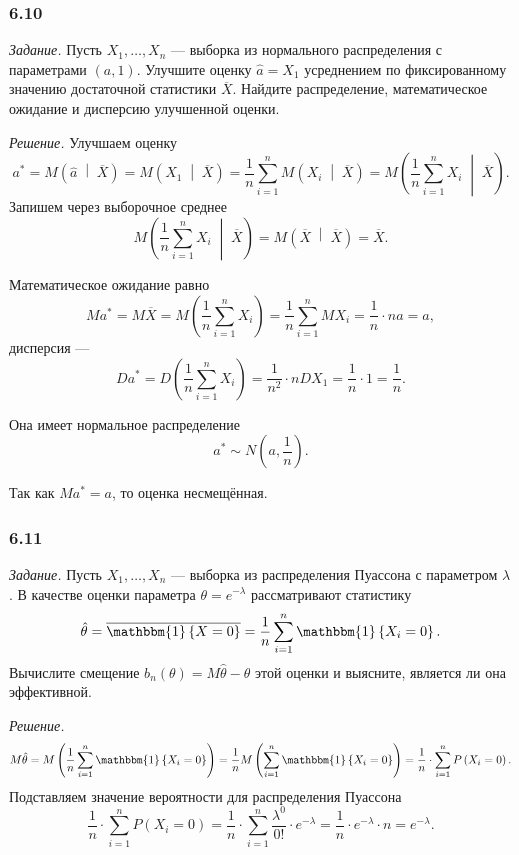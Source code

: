 \subsubsection*{6.10}

\textit{Задание.}
Пусть $X_1, \dotsc, X_n$ ---
выборка из нормального распределения с параметрами $ \left( a, 1 \right) $.
Улучшите оценку $ \hat{a} = X_1$ усреднением по фиксированному значению достаточной
статистики $ \overline{X}$.
Найдите распределение, математическое ожидание и дисперсию улучшенной оценки.

\textit{Решение.} Улучшаем оценку
$$a^* =
  M \left( \hat{a} \; \middle| \; \overline{X} \right) =
  M \left( X_1 \; \middle| \; \overline{X} \right) =
  \frac{1}{n} \sum \limits_{i = 1}^n M \left( X_i \; \middle| \; \overline{X} \right) =
  M \left( \frac{1}{n} \sum \limits_{i = 1}^n X_i \; \middle| \; \overline{X} \right).$$
Запишем через выборочное среднее
$$M \left( \frac{1}{n} \sum \limits_{i = 1}^n X_i \; \middle| \; \overline{X} \right) =
  M \left( \overline{X} \; \middle| \; \overline{X} \right) =
  \overline{X}.$$

Математическое ожидание равно
$$Ma^* =
  M \overline{X} =
  M \left( \frac{1}{n} \sum \limits_{i = 1}^n X_i \right) =
  \frac{1}{n} \sum \limits_{i = 1}^n MX_i =
  \frac{1}{n} \cdot na =
  a,$$
дисперсия ---
$$Da^* =
  D \left( \frac{1}{n} \sum \limits_{i = 1}^n X_i \right) =
  \frac{1}{n^2} \cdot n DX_1 =
  \frac{1}{n} \cdot 1 =
  \frac{1}{n}.$$

Она имеет нормальное распределение
$$a^* \sim
  N \left( a, \frac{1}{n} \right).$$

Так как $Ma^* = a$, то оценка несмещённая.

\subsubsection*{6.11}

\textit{Задание.}
Пусть $X_1, \dotsc, X_n$ --- выборка из распределения Пуассона с параметром $ \lambda $.
В качестве оценки параметра $ \theta = e^{- \lambda }$ рассматривают статистику
$$ \hat{ \theta } =
  \overline{ \mathbbm{1} \left\{ X = 0 \right\} } =
  \frac{1}{n} \sum \limits_{i = 1}^n \mathbbm{1} \left\{ X_i = 0 \right\}.$$
Вычислите смещение $b_n \left( \theta \right) = M \hat{ \theta } - \theta $ этой оценки и выясните,
является ли она эффективной.

\textit{Решение.}
$$M \hat{ \theta } =
  M \left( \frac{1}{n} \sum \limits_{i = 1}^n \mathbbm{1} \left\{ X_i = 0 \right\} \right) =
  \frac{1}{n} M \left( \sum \limits_{i = 1}^n \mathbbm{1} \left\{ X_i = 0 \right\} \right) =
  \frac{1}{n} \cdot \sum \limits_{i = 1}^n P \left( X_i = 0 \right).$$
Подставляем значение вероятности для распределения Пуассона
$$ \frac{1}{n} \cdot \sum \limits_{i = 1}^n P \left( X_i = 0 \right) =
  \frac{1}{n} \cdot \sum \limits_{i = 1}^n \frac{ \lambda^0}{0!} \cdot e^{- \lambda } =
  \frac{1}{n} \cdot e^{- \lambda } \cdot n =
  e^{- \lambda }.$$

